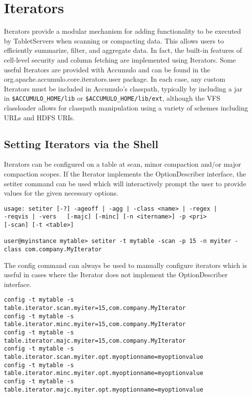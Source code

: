 \section{Iterators}
Iterators provide a modular mechanism for adding functionality to be executed by
TabletServers when scanning or compacting data. This allows users to efficiently
summarize, filter, and aggregate data. In fact, the built-in features of cell-level
security and column fetching are implemented using Iterators.
Some useful Iterators are provided with Accumulo and can be found in the org.apache.accumulo.core.iterators.user package.
In each case, any custom Iterators must be included in Accumulo's classpath,
typically by including a jar in \texttt{\$ACCUMULO\_HOME/lib} or
\texttt{\$ACCUMULO\_HOME/lib/ext}, although the VFS classloader allows for
classpath manipulation using a variety of schemes including URLs and HDFS URIs.

\subsection{Setting Iterators via the Shell}

Iterators can be configured on a table at scan, minor compaction and/or major
compaction scopes. If the Iterator implements the OptionDescriber interface, the
setiter command can be used which will interactively prompt the user to provide
values for the given necessary options. 

\begingroup\fontsize{8pt}{8pt}\selectfont\begin{verbatim}
usage: setiter [-?] -ageoff | -agg | -class <name> | -regex | 
-reqvis | -vers   [-majc] [-minc] [-n <itername>] -p <pri>   
[-scan] [-t <table>]

user@myinstance mytable> setiter -t mytable -scan -p 15 -n myiter -class com.company.MyIterator
\end{verbatim}\endgroup

The config command can always be used to manually configure iterators which is useful 
in cases where the Iterator does not implement the OptionDescriber interface.

\begingroup\fontsize{8pt}{8pt}\selectfont\begin{verbatim}
config -t mytable -s table.iterator.scan.myiter=15,com.company.MyIterator
config -t mytable -s table.iterator.minc.myiter=15,com.company.MyIterator
config -t mytable -s table.iterator.majc.myiter=15,com.company.MyIterator
config -t mytable -s table.iterator.scan.myiter.opt.myoptionname=myoptionvalue
config -t mytable -s table.iterator.minc.myiter.opt.myoptionname=myoptionvalue
config -t mytable -s table.iterator.majc.myiter.opt.myoptionname=myoptionvalue
\end{verbatim}\endgroup

